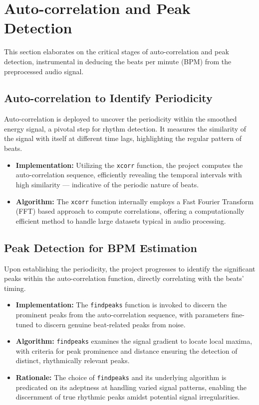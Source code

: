 \section{Auto-correlation and Peak Detection}

This section elaborates on the critical stages of auto-correlation and peak detection, instrumental in deducing the beats per minute (BPM) from the preprocessed audio signal.

\subsection{Auto-correlation to Identify Periodicity}

Auto-correlation is deployed to uncover the periodicity within the smoothed energy signal, a pivotal step for rhythm detection. It measures the similarity of the signal with itself at different time lags, highlighting the regular pattern of beats.

\begin{itemize}
    \item \textbf{Implementation:} Utilizing the \texttt{xcorr} function, the project computes the auto-correlation sequence, efficiently revealing the temporal intervals with high similarity — indicative of the periodic nature of beats.
    \item \textbf{Algorithm:} The \texttt{xcorr} function internally employs a Fast Fourier Transform (FFT) based approach to compute correlations, offering a computationally efficient method to handle large datasets typical in audio processing.
\end{itemize}

\subsection{Peak Detection for BPM Estimation}

Upon establishing the periodicity, the project progresses to identify the significant peaks within the auto-correlation function, directly correlating with the beats' timing.

\begin{itemize}
    \item \textbf{Implementation:} The \texttt{findpeaks} function is invoked to discern the prominent peaks from the auto-correlation sequence, with parameters fine-tuned to discern genuine beat-related peaks from noise.
    \item \textbf{Algorithm:} \texttt{findpeaks} examines the signal gradient to locate local maxima, with criteria for peak prominence and distance ensuring the detection of distinct, rhythmically relevant peaks.
    \item \textbf{Rationale:} The choice of \texttt{findpeaks} and its underlying algorithm is predicated on its adeptness at handling varied signal patterns, enabling the discernment of true rhythmic peaks amidst potential signal irregularities.
\end{itemize}

